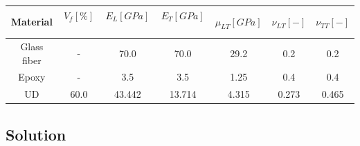 \documentclass[first,firstsupp,lastsupp,last,hyperref,table]{ETHclass}
\begin{document}
\begin{frame}
\begin{table}[htbp]
\begin{tabular}{ccccccc}
\textbf{Material} & \textbf{$V_{f}\left[\%\right]$}\  & \textbf{$E_{L}\left[GPa\right]$}\ & \textbf{$E_{T}\left[GPa\right]$}\  & \textbf{$\mu_{LT}\left[GPa\right]$} &\textbf{$\nu_{LT}\left[-\right]$} &\textbf{$\nu_{TT}\left[-\right]$} \\
\midrule
Glass fiber &-   & 70.0 & 70.0  & 29.2 & 0.2  & 0.2\\
Epoxy    &-& 3.5 & 3.5   & 1.25 &  0.4& 0.4\\
UD&60.0&43.442&13.714& 4.315& 0.273&0.465\\
\end{tabular}
\end{table}
\end{frame}

\subsection{Solution}
\end{document}
